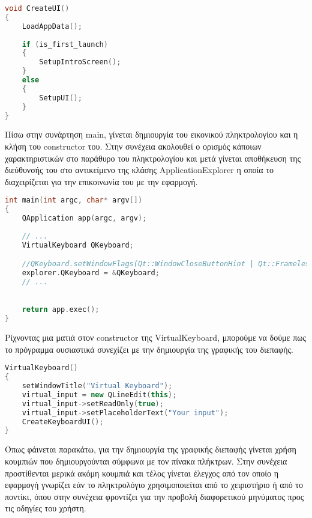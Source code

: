 \begin{lstlisting}[language=C++, style=cppstyle]
void CreateUI() 
{
    LoadAppData();
    
    if (is_first_launch)
    {
        SetupIntroScreen();
    }
    else
    {
        SetupUI();
    }
}
\end{lstlisting}

Πίσω στην συνάρτηση main, γίνεται δημιουργία του εικονικού πληκτρολογίου και η κλήση του constructor
του. Στην συνέχεια ακολουθεί ο ορισμός κάποιων χαρακτηριστικών στο παράθυρο του πληκτρολογίου και 
μετά γίνεται αποθήκευση της διεύθυνσής του στο αντικείμενο της κλάσης ApplicationExplorer η οποία
το διαχειρίζεται για την επικοινωνία του με την εφαρμογή.

\begin{lstlisting}[language=C++, style=cppstyle]
int main(int argc, char* argv[]) 
{
    QApplication app(argc, argv);
    
    // ...
    VirtualKeyboard QKeyboard;

    //QKeyboard.setWindowFlags(Qt::WindowCloseButtonHint | Qt::FramelessWindowHint);
    explorer.QKeyboard = &QKeyboard;
    // ...

    
    return app.exec();
}
\end{lstlisting}

Ρίχνοντας μια ματιά στον constructor της VirtualKeyboard, μπορούμε να δούμε πως το πρόγραμμα ουσιαστικά
συνεχίζει με την δημιουργία της γραφικής του διεπαφής.

\begin{lstlisting}[language=C++, style=cppstyle]
VirtualKeyboard()
{
    setWindowTitle("Virtual Keyboard");
    virtual_input = new QLineEdit(this);
    virtual_input->setReadOnly(true);
    virtual_input->setPlaceholderText("Your input");
    CreateKeyboardUI();
}
\end{lstlisting}

Όπως φάινεται παρακάτω, για την δημιουργία της γραφικής διεπαφής γίνεται χρήση κουμπιών που δημιουργούνται
σύμφωνα με τον πίνακα πλήκτρων. Στην συνέχεια προστίθενται μερικά ακόμη κουμπιά και τέλος γίνεται έλεγχος 
από τον οποίο η εφαρμογή γνωρίζει εάν το πληκτρολόγιο χρησιμοποιείται από το χειριστήριο ή από το ποντίκι,
όπου στην συνέχεια φροντίζει για την προβολή διαφορετικού μηνύματος προς τις οδηγίες του χρήστη.

